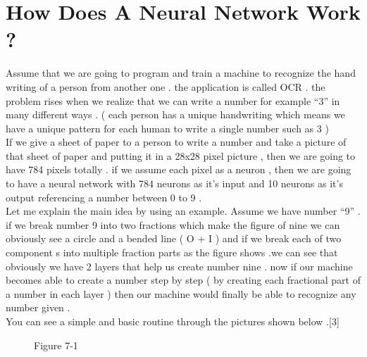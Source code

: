\documentclass[12pt , a4paper]{article}
\begin{document}
\section { How Does A Neural Network Work ? }
Assume that we are going to program and train a machine to recognize the hand writing of a person from another one . the application is called OCR . the problem rises when we realize that we can write a number for example “3” in many different ways . ( each person has a unique handwriting which means we have a unique pattern for each human to write a single number such as 3 )\\
If we give a sheet of paper to a person to write a number and take a picture of that sheet of paper and putting it in a 28x28 pixel picture , then we are going to have 784 pixels totally . if we assume each pixel as a neuron , then we are going to have a neural network with 784 neurons as it’s input and 10 neurons as it’s output referencing a number between 0 to 9 . \\
Let me explain the main idea by using an example. Assume we have number “9” . if we break number 9 into two fractions which make the figure of nine we can obviously see a circle and a bended line ( O +  I ) and if we break each of two component s into multiple fraction parts as the figure shows .we can see that obviously we have 2 layers that help us create number nine . now if our machine becomes able to create a number step by step ( by creating each fractional part of a number in each layer ) then our machine would finally be able to recognize any number given . \\
You can see a simple and basic routine through the pictures shown below .[3] \\




\begin{figure}[H]
\centering
\setlength{\fboxrule}{5pt}
\caption*{Figure 7-1}
\label{f-6-1}
\end{figure}
\end{document}
